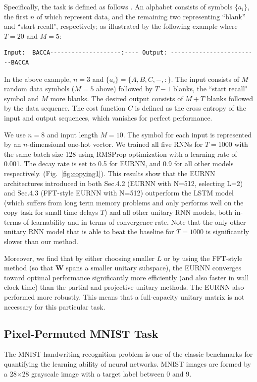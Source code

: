 Specifically, the task is defined as follows \cite{hochreiter1997long,arjovsky2015unitary,henaff2016orthogonal}. An alphabet consists of symbols  $\{a_i\}$, the first $n$ of which represent data, and the remaining two representing ``blank'' and ``start recall", respectively; as illustrated by the following example where $T=20$ and $M=5$:

\begin{verbatim}
Input:  BACCA--------------------:---- Output: -------------------------BACCA
\end{verbatim}

In the above example, $n=3$ and
$\{a_i\}=\{A, B, C,-,:\}$.
The input consists of $M$ random data symbols ($M=5$ above) followed by $T-1$ blanks, the ``start recall" symbol and $M$ more blanks. The desired output consists of $M+T$ blanks followed by the data sequence. The cost function $C$ is defined as the cross entropy of the input and output sequences, which vanishes for perfect performance.

We use $n=8$ and input length $M=10$. The symbol for each input is represented by an $n$-dimensional one-hot vector. We trained all five RNNs for $T=1000$ with the same batch size 128 using RMSProp optimization with a learning rate of 0.001. The decay rate is set to 0.5 for EURNN, and 0.9 for all other models respectively. (Fig.~\ref{fig:copying1}). This results show that the EURNN architectures introduced in both Sec.4.2 (EURNN with N=512, selecting L=2) and Sec.4.3 (FFT-style EURNN with N=512) outperform the LSTM model (which suffers from long term memory problems and only performs well on the copy task for small time delays $T$) and all other unitary RNN models, both in-terms of learnability and in-terms of convergence rate. Note that the only other unitary RNN model that is able to beat the baseline for $T=1000$ \cite{wisdom2016full} is significantly slower than our method.

Moreover, we find that by either choosing smaller $L$ or by using the FFT-style method (so that $\mathbf{W}$ spans a smaller unitary subspace), the EURNN converges toward optimal performance significantly more efficiently (and also faster in wall clock time) than the partial \cite{arjovsky2015unitary} and projective \cite{wisdom2016full} unitary methods. The EURNN also performed more robustly. This means that a full-capacity unitary matrix is not necessary for this particular task.

\subsection{Pixel-Permuted MNIST Task} The MNIST handwriting recognition problem is one of the classic benchmarks for quantifying the learning ability of neural networks. MNIST images are formed by a 28$\times$28 grayscale image with a target label between 0 and 9. 


